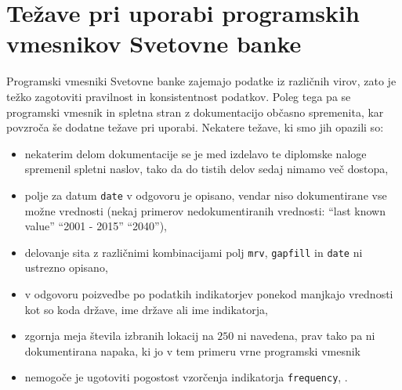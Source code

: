 \section{Težave pri uporabi programskih vmesnikov Svetovne banke}
\label{api_gotchas}


Programski vmesniki Svetovne banke zajemajo podatke iz različnih virov, zato je
težko zagotoviti pravilnost in konsistentnost podatkov. Poleg tega pa se 
programski vmesnik in spletna stran z dokumentacijo občasno spremenita, kar
povzroča še dodatne težave pri uporabi. Nekatere težave, ki smo jih opazili
so:
\begin{itemize}  
\item nekaterim delom dokumentacije se je med izdelavo te diplomske naloge
  spremenil spletni naslov, tako da do tistih delov sedaj nimamo več dostopa,
\item polje za datum \verb|date| v odgovoru je opisano, vendar niso dokumentirane vse možne vrednosti
    (nekaj primerov nedokumentiranih vrednosti:
    ``last known value'' ``2001 - 2015'' ``2040''),
\item delovanje sita z različnimi kombinacijami polj \verb|mrv|, \verb|gapfill|
  in \verb|date| ni ustrezno opisano,
\item v odgovoru poizvedbe po podatkih indikatorjev ponekod manjkajo vrednosti
  kot so koda države, ime države ali ime indikatorja,
\item zgornja meja števila izbranih lokacij na $250$ ni navedena, prav tako pa ni
  dokumentirana napaka, ki jo v tem primeru vrne programski vmesnik
\item nemogoče je ugotoviti pogostost vzorčenja indikatorja \verb|frequency|, .
\end{itemize}  







